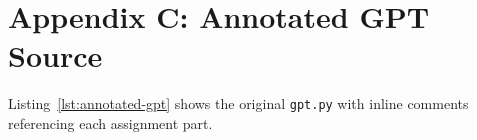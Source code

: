 \documentclass[11pt]{article}
\begin{document}
\section*{Appendix C: Annotated GPT Source}

Listing~\ref{lst:annotated-gpt} shows the original \texttt{gpt.py} with inline comments referencing each assignment part.


\end{document}
